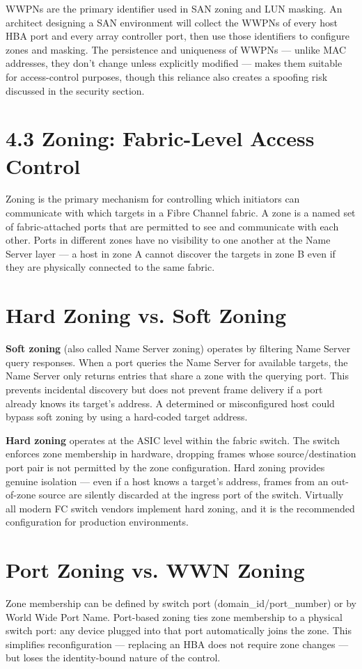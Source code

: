 WWPNs are the primary identifier used in SAN zoning and LUN masking. An architect designing a SAN environment will collect the WWPNs of every host HBA port and every array controller port, then use those identifiers to configure zones and masking. The persistence and uniqueness of WWPNs --- unlike MAC addresses, they don't change unless explicitly modified --- makes them suitable for access-control purposes, though this reliance also creates a spoofing risk discussed in the security section.

\section{4.3 Zoning: Fabric-Level Access Control}
Zoning is the primary mechanism for controlling which initiators can communicate with which targets in a Fibre Channel fabric. A zone is a named set of fabric-attached ports that are permitted to see and communicate with each other. Ports in different zones have no visibility to one another at the Name Server layer --- a host in zone A cannot discover the targets in zone B even if they are physically connected to the same fabric.

\section{Hard Zoning vs. Soft Zoning}
\textbf{Soft zoning} (also called Name Server zoning) operates by filtering Name Server query responses. When a port queries the Name Server for available targets, the Name Server only returns entries that share a zone with the querying port. This prevents incidental discovery but does not prevent frame delivery if a port already knows its target's address. A determined or misconfigured host could bypass soft zoning by using a hard-coded target address.

\textbf{Hard zoning} operates at the ASIC level within the fabric switch. The switch enforces zone membership in hardware, dropping frames whose source/destination port pair is not permitted by the zone configuration. Hard zoning provides genuine isolation --- even if a host knows a target's address, frames from an out-of-zone source are silently discarded at the ingress port of the switch. Virtually all modern FC switch vendors implement hard zoning, and it is the recommended configuration for production environments.

\section{Port Zoning vs. WWN Zoning}
Zone membership can be defined by switch port (domain\_id/port\_number) or by World Wide Port Name. Port-based zoning ties zone membership to a physical switch port: any device plugged into that port automatically joins the zone. This simplifies reconfiguration --- replacing an HBA does not require zone changes --- but loses the identity-bound nature of the control.

